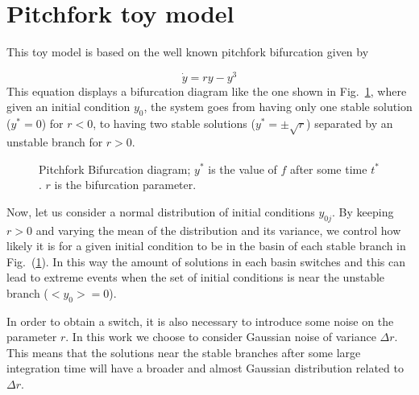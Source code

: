 \section{Pitchfork toy model}

This toy model is based on the well known pitchfork bifurcation  given by

\begin{equation}
	\dot{y}=r y-y^3
	\label{eq:pitchfork}
\end{equation}
This equation displays a bifurcation diagram like the one shown in Fig.~\ref{fig:bifdiag}, where given an initial condition $y_0$, the system goes from having only one stable solution ($y^*=0$) for $r<0$, to having two stable solutions ($y^*=\pm \sqrt{r}$) separated by an unstable branch for $r>0$.
\begin{figure}[htb]
	\centering
	\caption{ Pitchfork Bifurcation diagram; $y^*$ is the value of $f$ after some time $t^*$. $r$ is the bifurcation parameter.}        
	\label{fig:bifdiag}
\end{figure}



Now, let us consider a normal distribution of initial conditions $y_{0j}$. By keeping $r>0$ and varying the mean of the distribution and its variance, we control how likely it is for a given initial condition to be in the basin of each stable branch in Fig.~(\ref{fig:bifdiag}). In this way the amount of solutions in each basin switches and this can lead to extreme events when the set of initial conditions is near the unstable branch ($<\! y_{0}\!>=0$).

In order to obtain a switch, it is also necessary to introduce some noise on the parameter $r$. In this work we choose to consider Gaussian noise of variance $\Delta r$.
This means that the solutions near the stable branches after some large integration time will have a broader and almost Gaussian distribution related to $\Delta r$. 

